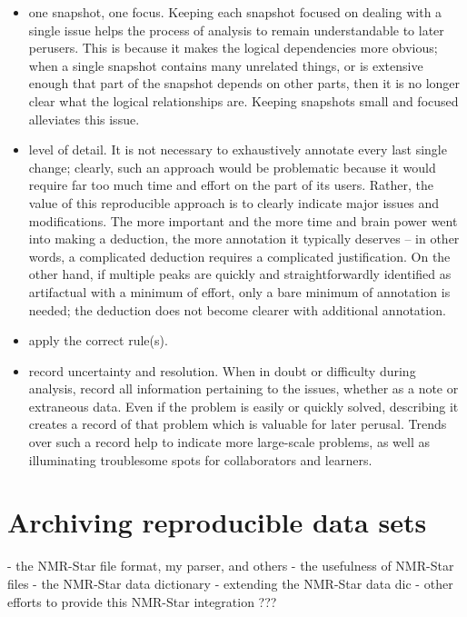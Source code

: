 \begin{itemize}
  \item one snapshot, one focus.  Keeping each snapshot focused on dealing
    with a single issue helps the process of analysis to remain understandable
    to later perusers.  This is because it makes the logical dependencies 
    more obvious; when a single snapshot contains many unrelated things, or
    is extensive enough that part of the snapshot depends on other parts, then
    it is no longer clear what the logical relationships are.  Keeping snapshots
    small and focused alleviates this issue.
  \item level of detail.  It is not necessary to exhaustively annotate every
    last single change; clearly, such an approach would be problematic because
    it would require far too much time and effort on the part of its users.
    Rather, the value of this reproducible approach is to clearly indicate 
    major issues and modifications.  The more important and the more time and
    brain power went into making a deduction, the more annotation it typically
    deserves -- in other words, a complicated deduction requires a complicated
    justification.  On the other hand, if multiple peaks are quickly and
    straightforwardly identified as artifactual with a minimum of effort, 
    only a bare minimum of annotation is needed; the deduction does not become
    clearer with additional annotation.
  \item apply the correct rule(s).
  \item record uncertainty and resolution.  When in doubt or difficulty 
    during analysis, record all information pertaining to the issues, whether
    as a note or extraneous data.  Even if the problem is easily or quickly
    solved, describing it creates a record of that problem which is valuable
    for later perusal.  Trends over such a record help to indicate more 
    large-scale problems, as well as illuminating troublesome spots for
    collaborators and learners.
\end{itemize}
   


\section{Archiving reproducible data sets}
 - the NMR-Star file format, my parser, and others
 - the usefulness of NMR-Star files
 - the NMR-Star data dictionary
 - extending the NMR-Star data dic
 - other efforts to provide this NMR-Star integration ???


